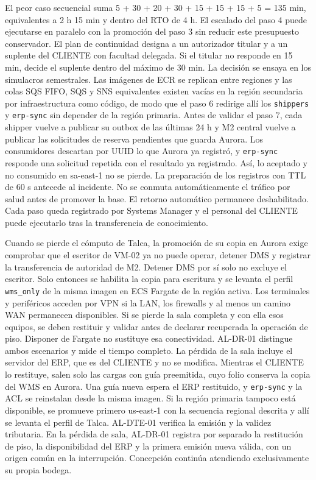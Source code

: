 El peor caso secuencial suma 5 + 30 + 20 + 30 + 15 + 15 + 15 + 5 = 135 min, equivalentes a 2 h 15 min y dentro del RTO de 4 h. El escalado del paso 4 puede ejecutarse en paralelo con la promoción del paso 3 sin reducir este presupuesto conservador. El plan de continuidad designa a un autorizador titular y a un suplente del CLIENTE con facultad delegada. Si el titular no responde en 15 min, decide el suplente dentro del máximo de 30 min. La decisión se ensaya en los simulacros semestrales. Las imágenes de ECR se replican entre regiones y las colas SQS FIFO, SQS y SNS equivalentes existen vacías en la región secundaria por infraestructura como código, de modo que el paso 6 redirige allí los \texttt{shippers} y \texttt{erp-sync} sin depender de la región primaria. Antes de validar el paso 7, cada shipper vuelve a publicar su outbox de las últimas 24 h y M2 central vuelve a publicar las solicitudes de reserva pendientes que guarda Aurora. Los consumidores descartan por UUID lo que Aurora ya registró, y \texttt{erp-sync} responde una solicitud repetida con el resultado ya registrado. Así, lo aceptado y no consumido en sa-east-1 no se pierde. La preparación de los registros con TTL de 60 s antecede al incidente. No se conmuta automáticamente el tráfico por salud antes de promover la base. El retorno automático permanece deshabilitado. Cada paso queda registrado por Systems Manager y el personal del CLIENTE puede ejecutarlo tras la transferencia de conocimiento.

Cuando se pierde el cómputo de Talca, la promoción de su copia en Aurora exige comprobar que el escritor de VM-02 ya no puede operar, detener DMS y registrar la transferencia de autoridad de M2. Detener DMS por sí solo no excluye el escritor. Solo entonces se habilita la copia para escritura y se levanta el perfil \texttt{wms\_only} de la misma imagen en ECS Fargate de la región activa. Los terminales y periféricos acceden por VPN si la LAN, los firewalls y al menos un camino WAN permanecen disponibles. Si se pierde la sala completa y con ella esos equipos, se deben restituir y validar antes de declarar recuperada la operación de piso. Disponer de Fargate no sustituye esa conectividad. AL-DR-01 distingue ambos escenarios y mide el tiempo completo. La pérdida de la sala incluye el servidor del ERP, que es del CLIENTE y no se modifica. Mientras el CLIENTE lo restituye, salen solo las cargas con guía preemitida, cuyo folio conserva la copia del WMS en Aurora. Una guía nueva espera el ERP restituido, y \texttt{erp-sync} y la ACL se reinstalan desde la misma imagen. Si la región primaria tampoco está disponible, se promueve primero us-east-1 con la secuencia regional descrita y allí se levanta el perfil de Talca. AL-DTE-01 verifica la emisión y la validez tributaria. En la pérdida de sala, AL-DR-01 registra por separado la restitución de piso, la disponibilidad del ERP y la primera emisión nueva válida, con un origen común en la interrupción. Concepción continúa atendiendo exclusivamente su propia bodega.

